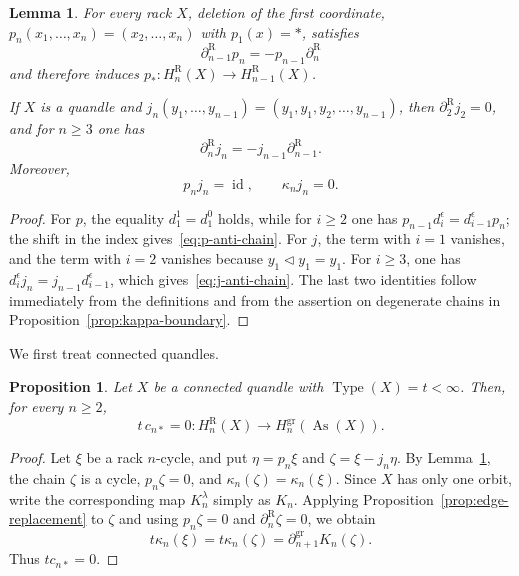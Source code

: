 \documentclass[11pt]{article}
\newtheorem{proposition}[theorem]{Proposition}
\newtheorem{lemma}[theorem]{Lemma}
\DeclareMathOperator{\As}{As}
\DeclareMathOperator{\Type}{Type}
\newcommand{\gr}{\mathrm{gr}}
\newcommand{\R}{\mathrm R}
\begin{document}
\begin{lemma}
\label{lem:auxiliary-maps}
For every rack $X$, deletion of the first coordinate, $p_n(x_1,\ldots,x_n)=(x_2,\ldots,x_n)$ with $p_1(x)=*$, satisfies
\begin{equation}
 \partial_{n-1}^\R p_n=-p_{n-1}\partial_n^\R
 \label{eq:p-anti-chain}
\end{equation}
and therefore induces $p_*\colon H_n^\R(X)\to H_{n-1}^\R(X)$.

If $X$ is a quandle and $j_n(y_1,\ldots,y_{n-1})=(y_1,y_1,y_2,\ldots,y_{n-1})$, then $\partial_2^\R j_2=0$, and for $n\ge3$ one has
\begin{equation}
 \partial_n^\R j_n=-j_{n-1}\partial_{n-1}^\R.
 \label{eq:j-anti-chain}
\end{equation}
Moreover,
\[
p_nj_n=\operatorname{id},
 \qquad
 \kappa_nj_n=0.
\]
\end{lemma}

\begin{proof}
For $p$, the equality $d_1^1=d_1^0$ holds, while for $i\ge2$ one has $p_{n-1}d_i^\epsilon=d_{i-1}^\epsilon p_n$; the shift in the index gives~\eqref{eq:p-anti-chain}. For $j$, the term with $i=1$ vanishes, and the term with $i=2$ vanishes because $y_1\lhd y_1=y_1$. For $i\ge3$, one has $d_i^\epsilon j_n=j_{n-1}d_{i-1}^\epsilon$, which gives~\eqref{eq:j-anti-chain}. The last two identities follow immediately from the definitions and from the assertion on degenerate chains in Proposition~\ref{prop:kappa-boundary}.
\end{proof}

We first treat connected quandles.

\begin{proposition}
\label{prop:connected-quandle-annihilation}
Let $X$ be a connected quandle with $\Type(X)=t<\infty$. Then, for every $n\ge2$,
\[
        t\,c_{n*}=0
        \colon H_n^\R(X)\longrightarrow H_n^{\gr}(\As(X)).
\]
\end{proposition}

\begin{proof}
Let $\xi$ be a rack $n$-cycle, and put $\eta=p_n\xi$ and
$\zeta=\xi-j_n\eta$. By Lemma~\ref{lem:auxiliary-maps}, the chain $\zeta$ is a cycle, $p_n\zeta=0$, and $\kappa_n(\zeta)=\kappa_n(\xi)$.
Since $X$ has only one orbit, write the corresponding map $K_n^\lambda$ simply as $K_n$. Applying Proposition~\ref{prop:edge-replacement} to $\zeta$ and using $p_n\zeta=0$ and $\partial_n^\R\zeta=0$, we obtain
\[
 t\kappa_n(\xi)=t\kappa_n(\zeta)=\partial_{n+1}^{\gr}K_n(\zeta).
\]
Thus $t c_{n*}=0$.
\end{proof}
\end{document}
